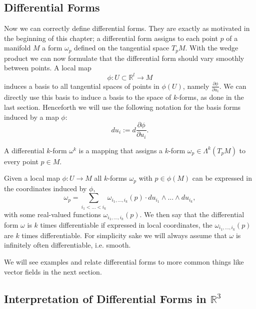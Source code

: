 \subsection{Differential Forms}
\label{subsec:defDiffform}
Now we can correctly define differential forms. They are exactly as motivated in the beginning of this chapter; a differential form assigns to each point $p$ of a manifold $M$ a form $\omega_p$ defined on the tangential space $T_pM$. With the wedge product we can now formulate that the differential form should vary smoothly between points. A local map 
\[\phi:  U \subset\mathbb R^l \to M\] 
induces a basis to all tangential spaces of points in $\phi(U)$, namely $\frac{\partial \phi}{\partial u_i}$. We can directly use this basis to induce a basis to the space of $k$-forms, as done in the last section. Henceforth we will use the following notation for the basis forms induced by a map $\phi$:
\[d u_i:= d\frac{\partial \phi}{\partial u_i}.\]

\begin{definition}
A differential $k$-form $\omega^k$ is a mapping that assigns a $k$-form $\omega_p \in \Lambda^k(T_pM)$ to every point $p\in M$.

Given a local map $\phi: U \rightarrow M$ all $k$-forms $\omega_p$ with $p\in \phi(M)$ can be expressed in the  coordinates induced by $\phi$,
\[\omega_p = \sum_{i_1<...<i_k}\omega_{i_1,...,i_k}(p) \cdot du_{i_1}\wedge...\wedge du_{i_k},\]
with some real-valued functions $\omega_{i_1,...,i_k}(p)$. We then say that the differential form $\omega$ is $k$ times differentiable if expressed in local coordinates, the $\omega_{i_1,...,i_k}(p)$ are $k$ times differentiable. For simplicity sake we will always assume that $\omega$ is infinitely often differentiable, i.e. smooth.

\end{definition}

We will see examples and relate differential forms to more common things like vector fields in the next section. 


\subsection{Interpretation of Differential Forms in $\mathbb{R}^3$}



